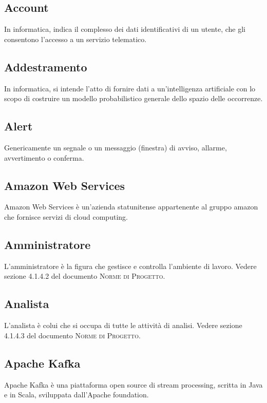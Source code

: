 

\subsection*{Account}
In informatica, indica il complesso dei dati identificativi di un utente, che gli consentono l'accesso a un servizio telematico.

\subsection*{Addestramento}
In informatica, si intende l'atto di fornire dati a un'intelligenza artificiale con lo scopo di costruire un modello probabilistico generale dello spazio delle occorrenze.

\subsection*{Alert}
Genericamente un segnale o un messaggio (finestra) di avviso, allarme, avvertimento o conferma.

\subsection*{Amazon Web Services}
Amazon Web Services è un'azienda statunitense appartenente al gruppo amazon che fornisce servizi di cloud computing.

\subsection*{Amministratore}
L’amministratore è la figura che gestisce e controlla l’ambiente di lavoro. Vedere sezione 4.1.4.2 del documento \textsc{Norme di Progetto}.

\subsection*{Analista}
L’analista è colui che si occupa di tutte le attività di analisi. Vedere sezione 4.1.4.3 del documento \textsc{Norme di Progetto}.

\subsection*{Apache Kafka}
Apache Kafka è una piattaforma open source di stream processing, scritta in Java e in Scala, sviluppata dall'Apache foundation.

